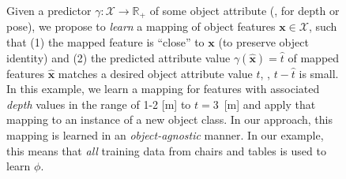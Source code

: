 \documentclass[10pt,twocolumn,letterpaper]{article}
\begin{document}
\begin{figure}[t!]
\caption{\label{fig:intro} Given a predictor $\gamma: \mathcal{X} \to \mathbb{R}_+$
of some object attribute (\eg, for depth or pose), we propose to \emph{learn} a mapping 
of object features $\mathbf{x} \in \mathcal{X}$, such that
(1) the mapped feature is ``close'' to $\mathbf{x}$ (to preserve object identity) and (2) the predicted 
attribute value $\gamma(\hat{\mathbf{x}}) = \hat{t}$ of mapped features 
$\hat{\mathbf{x}}$
matches a desired object attribute value $t$, \ie, $t-\hat{t}$ is small. In this example,
we learn a mapping for features with associated \emph{depth} values in the
range of 1-2 [m] to $t=3$~[m] and apply that mapping to an instance of a new 
object class. In our approach, this mapping is learned in 
an \emph{object-agnostic} manner. In our example, this means that
\emph{all} training data from chairs and tables is used to learn $\phi$.}
\end{figure}
\end{document}
